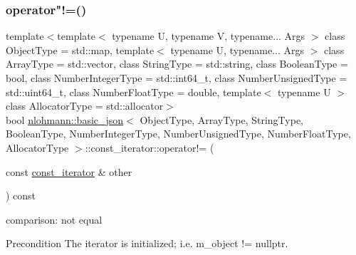 \subsubsection{\texorpdfstring{operator"!=()}{operator!=()}}
{\footnotesize\ttfamily template$<$template$<$ typename U, typename V, typename... Args $>$ class Object\+Type = std\+::map, template$<$ typename U, typename... Args $>$ class Array\+Type = std\+::vector, class String\+Type  = std\+::string, class Boolean\+Type  = bool, class Number\+Integer\+Type  = std\+::int64\+\_\+t, class Number\+Unsigned\+Type  = std\+::uint64\+\_\+t, class Number\+Float\+Type  = double, template$<$ typename U $>$ class Allocator\+Type = std\+::allocator$>$ \\
bool \hyperlink{classnlohmann_1_1basic__json}{nlohmann\+::basic\+\_\+json}$<$ Object\+Type, Array\+Type, String\+Type, Boolean\+Type, Number\+Integer\+Type, Number\+Unsigned\+Type, Number\+Float\+Type, Allocator\+Type $>$\+::const\+\_\+iterator\+::operator!= (\begin{DoxyParamCaption}\item[{const \hyperlink{classnlohmann_1_1basic__json_1_1const__iterator}{const\+\_\+iterator} \&}]{other }\end{DoxyParamCaption}) const\hspace{0.3cm}{\ttfamily [inline]}}



comparison\+: not equal 

\begin{DoxyPrecond}{Precondition}
The iterator is initialized; i.\+e. {\ttfamily m\+\_\+object != nullptr}. 
\end{DoxyPrecond}
\mbox{\label{classnlohmann_1_1basic__json_1_1const__iterator_acfc918b6350449111ca58af5eb3da999}} 
